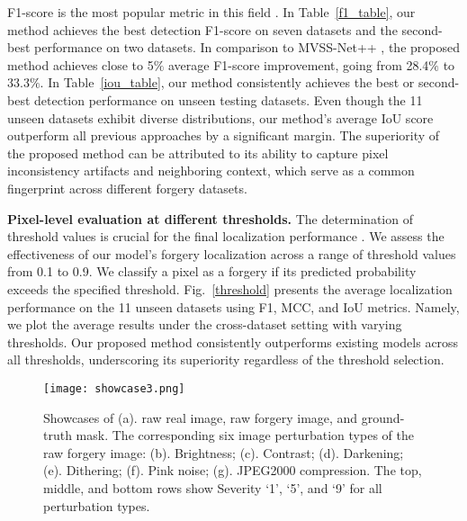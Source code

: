 \documentclass[10pt,journal,compsoc]{IEEEtran}
\begin{document}
F1-score is the most popular metric in this field \cite{ying2023learning, qi2022principled, rao2022towards, dong2013casia}. In Table~\ref{f1_table}, our method achieves the best detection F1-score on seven datasets and the second-best performance on two datasets. In comparison to MVSS-Net++ \cite{dong2022mvss}, the proposed method achieves close to 5$\%$ average F1-score improvement, going from 28.4$\%$ to 33.3$\%$.  %
 In Table~\ref{iou_table}, our method consistently achieves the best or second-best detection performance on unseen testing datasets. Even though the 11 unseen datasets exhibit diverse distributions, our method's average IoU score outperform all previous approaches by a significant margin. The superiority of the proposed method can be attributed to its ability to capture pixel inconsistency artifacts and neighboring context, which serve as a common fingerprint across different forgery datasets. 

\noindent\textbf{Pixel-level evaluation at different thresholds.} The determination of threshold values is crucial for the final localization performance \cite{dong2022mvss}. We assess the effectiveness of our model's forgery localization across a range of threshold values from 0.1 to 0.9. We classify a pixel as a forgery if its predicted probability exceeds the specified threshold. Fig.~\ref{threshold} presents the average localization performance on the 11 unseen datasets using F1, MCC, and IoU metrics. Namely, we plot the average results under the cross-dataset setting with varying thresholds. Our proposed method consistently outperforms existing models across all thresholds, underscoring its superiority regardless of the threshold selection.


\begin{figure*}[ht]
\centering
\texttt{[image:  showcase3.png]}
\caption{Showcases of (a). raw real image, raw forgery image, and ground-truth mask. The corresponding six image perturbation types of the raw forgery image: (b). Brightness; (c). Contrast; (d). Darkening; (e). Dithering; (f). Pink noise; (g). JPEG2000 compression. The top, middle, and bottom rows show Severity `1', `5', and `9' for all perturbation types.}
\label{perturbation}
\end{figure*}
\end{document}
